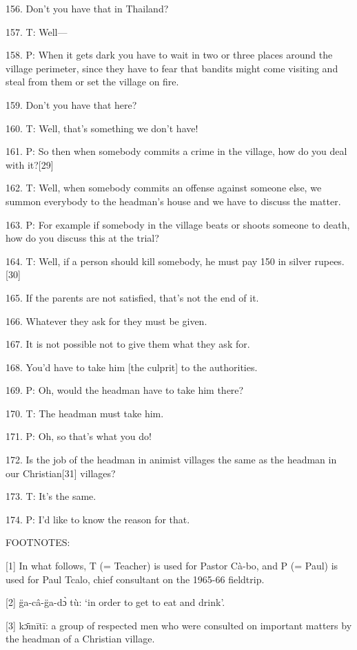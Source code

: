 {156. Don't you have that in Thailand?}

{157. T: Well---}

{158. P: When it gets dark you have to wait in two or three places around
the village perimeter, since they have to fear that bandits might come visiting
and steal from them or set the village on fire.}

{159. Don't you have that here?}

{160. T: Well, that's something we don't have!}

{161. P: So then when somebody commits a crime in the village, how do you
deal with it?[29]}

{162. T: Well, when somebody commits an offense against someone else, we
summon everybody to the headman's house and we have to discuss the matter.}

{163. P: For example if somebody in the village beats or shoots someone
to death, how do you discuss this at the trial?}

{164. T: Well, if a person should kill somebody, he must pay 150 in silver
rupees.[30]}

{165. If the parents are not satisfied, that's not the end of it.}

{166. Whatever they ask for they must be given.}

{167. It is not possible not to give them what they ask for.}

{168. You'd have to take him [the culprit] to the authorities.}

{169. P: Oh, would the headman have to take him there?}

{170. T: The headman must take him.}

{171. P: Oh, so that's what you do!}

{172. Is the job of the headman in animist villages the same as the headman
in our Christian[31] villages?}

{173. T: It's the same.}

{174. P: I'd like to know the reason for that.}

{FOOTNOTES:}

{[1] In what follows, T (= Teacher) is used for Pastor Cà-bo, and P (=
Paul) is used for Paul Tcalo, chief consultant on the 1965-66 fieldtrip.}

{[2] g̈a-câ-g̈a-dɔ̀ tù: `in order to get to eat and drink'.}

{[3] kɔ̄mītī: a group of respected men who were consulted on important
matters by the headman of a Christian village.}

